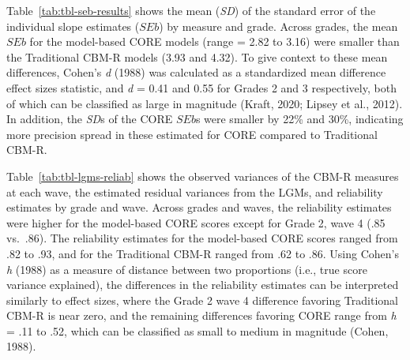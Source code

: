 \documentclass[
  english,
  man, fleqn, noextraspace]{apa6}
\begin{document}
Table~\ref{tab:tbl-seb-results} shows the mean (\emph{SD}) of the standard error of the individual slope estimates (\(SEb\)) by measure and grade. Across grades, the mean \(SEb\) for the model-based CORE models (range = 2.82 to 3.16) were smaller than the Traditional CBM-R models (3.93 and 4.32). To give context to these mean differences, Cohen's \emph{d} (1988) was calculated as a standardized mean difference effect sizes statistic, and \emph{d} = 0.41 and 0.55 for Grades 2 and 3 respectively, both of which can be classified as large in magnitude (Kraft, 2020; Lipsey et al., 2012). In addition, the \emph{SD}s of the CORE \(SEb\)s were smaller by 22\% and 30\%, indicating more precision spread in these estimated for CORE compared to Traditional CBM-R.

Table~\ref{tab:tbl-lgms-reliab} shows the observed variances of the CBM-R measures at each wave, the estimated residual variances from the LGMs, and reliability estimates by grade and wave. Across grades and waves, the reliability estimates were higher for the model-based CORE scores except for Grade 2, wave 4 (.85 vs.~.86). The reliability estimates for the model-based CORE scores ranged from .82 to .93, and for the Traditional CBM-R ranged from .62 to .86. Using Cohen's \emph{h} (1988) as a measure of distance between two proportions (i.e., true score variance explained), the differences in the reliability estimates can be interpreted similarly to effect sizes, where the Grade 2 wave 4 difference favoring Traditional CBM-R is near zero, and the remaining differences favoring CORE range from \emph{h} = .11 to .52, which can be classified as small to medium in magnitude (Cohen, 1988).
\end{document}
